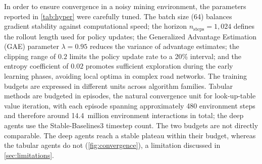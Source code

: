 \documentclass[11pt,a4paper]{article}
\begin{document}
In order to ensure convergence in a noisy mining environment, the parameters reported in \cref{tab:hyper} were carefully tuned. The batch size (64) balances gradient stability against computational speed; the horizon $n_{\mathrm{steps}} = 1{,}024$ defines the rollout length used for policy updates; the Generalized Advantage Estimation (GAE) parameter $\lambda = 0.95$ reduces the variance of advantage estimates; the clipping range of $0.2$ limits the policy update rate to a 20\% interval; and the entropy coefficient of $0.02$ promotes sufficient exploration during the early learning phases, avoiding local optima in complex road networks. The training budgets are expressed in different units across algorithm families. Tabular methods are budgeted in episodes, the natural convergence unit for look-up-table value iteration, with each episode spanning approximately 480 environment steps and therefore around 14.4~million environment interactions in total; the deep agents use the Stable-Baselines3 timestep count. The two budgets are not directly comparable. The deep agents reach a stable plateau within their budget, whereas the tabular agents do not (\cref{fig:convergence}), a limitation discussed in \cref{sec:limitations}.
\end{document}
